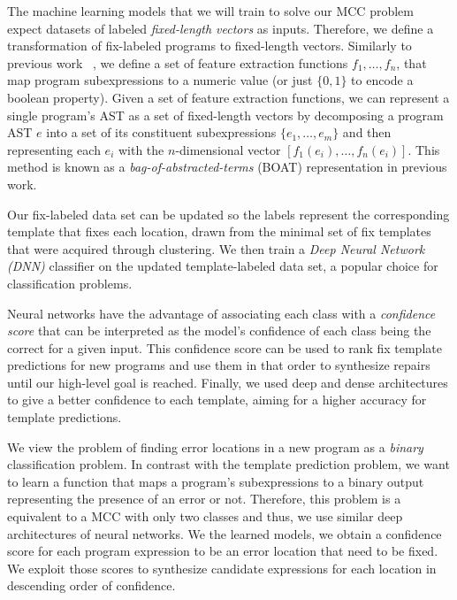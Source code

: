  The machine learning models that we will train to
solve our MCC problem expect datasets of labeled \emph{fixed-length vectors} as
inputs. Therefore, we define a transformation of fix-labeled programs to
fixed-length vectors. Similarly to previous work ~\citep{Seidel:2017}, we define
a set of feature extraction functions $f_1, \ldots, f_n$, that map program
subexpressions to a numeric value (or just $\{0, 1\}$ to encode a boolean
property). Given a set of feature extraction functions, we can represent a
single program's AST as a set of fixed-length vectors by decomposing a program
AST $e$ into a set of its constituent subexpressions $\{e_1, \ldots, e_m\}$ and
then representing each $e_i$ with the $n$-dimensional vector $[f_1(e_i), \ldots,
f_n(e_i)]$. This method is known as a \emph{bag-of-abstracted-terms} (BOAT)
representation in previous work.

Our fix-labeled data set can be updated so the labels represent the
corresponding template that fixes each location, drawn from the minimal set of
fix templates that were acquired through clustering. We then train a \emph{Deep
Neural Network (DNN)} classifier on the updated template-labeled data set, a
popular choice for classification problems.

Neural networks have the advantage of associating each class with a
\emph{confidence score} that can be interpreted as the model's confidence of
each class being the correct for a given input. This confidence score can be
used to rank fix template predictions for new programs and use them in that
order to synthesize repairs until our high-level goal is reached. Finally, we
used deep and dense architectures to give a better confidence to each template,
aiming for a higher accuracy for template predictions.

 We view the problem of finding error locations in a
new program as a \emph{binary} classification problem. In contrast with the
template prediction problem, we want to learn a function that maps a program's
subexpressions to a binary output representing the presence of an error or not.
Therefore, this problem is a equivalent to a MCC with only two classes and thus,
we use similar deep architectures of neural networks. We the learned models, we
obtain a confidence score for each program expression to be an error location
that need to be fixed. We exploit those scores to synthesize candidate
expressions for each location in descending order of confidence.

